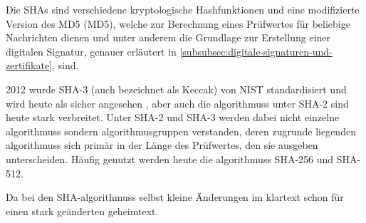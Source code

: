 Die \acfp{SHA} sind verschiedene kryptologische Hashfunktionen und eine modifizierte Version des \gls{MD5} (\acs{MD5}), welche zur Berechnung eines Prüfwertes für beliebige Nachrichten dienen und unter anderem die Grundlage zur Erstellung einer digitalen Signatur, genauer erläutert in \autoref{subsubsec:digitale-signaturen-und-zertifikate}, sind\autocite[]{WhatisSH81:online}.

2012 wurde \ac{SHA}-3 (auch bezeichnet als Keccak) von \ac{NIST} standardisiert und wird heute als sicher angesehen \autocite[\pagef~239]{buchmann_einfuhrung_2016}, aber auch die \glspl{algorithmus} unter \ac{SHA}-2 sind heute stark verbreitet. Unter \ac{SHA}-2 und \ac{SHA}-3 werden dabei nicht einzelne \glspl{algorithmus} sondern \gls{algorithmus}gruppen verstanden, deren zugrunde liegenden \glspl{algorithmus} sich primär in der Länge des Prüfwertes, den sie ausgeben unterscheiden. Häufig genutzt werden heute die \glspl{algorithmus} \ac{SHA}-256 und \ac{SHA}-512.

Da bei den \ac{SHA}-\glspl{algorithmus} selbst kleine Änderungen im \gls{klartext} schon für einen stark geänderten \gls{geheimtext}.

